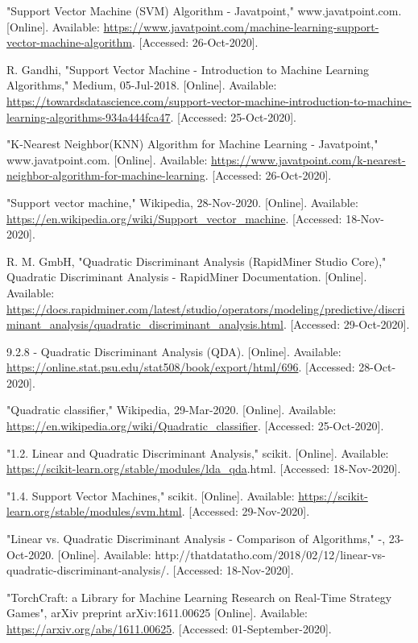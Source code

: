 \documentclass[a4paper,12pt]{report}
\begin{document}
\begin{enumerate}[label={[\arabic*]}]
\item "Support Vector Machine (SVM) Algorithm - Javatpoint," www.javatpoint.com. [Online]. Available: \url{https://www.javatpoint.com/machine-learning-support-vector-machine-algorithm}. [Accessed: 26-Oct-2020].
\item R. Gandhi, "Support Vector Machine - Introduction to Machine Learning Algorithms," Medium, 05-Jul-2018. [Online]. Available: \url{https://towardsdatascience.com/support-vector-machine-introduction-to-machine-learning-algorithms-934a444fca47}. [Accessed: 25-Oct-2020].
\item "K-Nearest Neighbor(KNN) Algorithm for Machine Learning - Javatpoint," www.javatpoint.com. [Online]. Available: \url{https://www.javatpoint.com/k-nearest-neighbor-algorithm-for-machine-learning}. [Accessed: 26-Oct-2020].
\item "Support vector machine," Wikipedia, 28-Nov-2020. [Online]. Available: \url{https://en.wikipedia.org/wiki/Support_vector_machine}. [Accessed: 18-Nov-2020].
\item R. M. GmbH, "Quadratic Discriminant Analysis (RapidMiner Studio Core)," Quadratic Discriminant Analysis - RapidMiner Documentation. [Online]. Available: \url{https://docs.rapidminer.com/latest/studio/operators/modeling/predictive/discriminant_analysis/quadratic_discriminant_analysis.html}. [Accessed: 29-Oct-2020].
\item 9.2.8 - Quadratic Discriminant Analysis (QDA). [Online]. Available: \url{https://online.stat.psu.edu/stat508/book/export/html/696}. [Accessed: 28-Oct-2020].
\item "Quadratic classifier," Wikipedia, 29-Mar-2020. [Online]. Available: \url{https://en.wikipedia.org/wiki/Quadratic_classifier}. [Accessed: 25-Oct-2020].
\item "1.2. Linear and Quadratic Discriminant Analysis," scikit. [Online]. Available: \url{https://scikit-learn.org/stable/modules/lda_qda}.html. [Accessed: 18-Nov-2020].
\item "1.4. Support Vector Machines," scikit. [Online]. Available: \url{https://scikit-learn.org/stable/modules/svm.html}. [Accessed: 29-Nov-2020].
\item "Linear vs. Quadratic Discriminant Analysis - Comparison of Algorithms," -, 23-Oct-2020. [Online]. Available: http://thatdatatho.com/2018/02/12/linear-vs-quadratic-discriminant-analysis/. [Accessed: 18-Nov-2020].
\item "TorchCraft: a Library for Machine Learning Research on Real-Time Strategy Games", arXiv preprint arXiv:1611.00625 [Online]. Available: \url{https://arxiv.org/abs/1611.00625}. [Accessed: 01-September-2020].

\end{enumerate}
\end{document}
